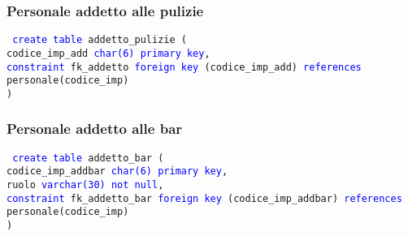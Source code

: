 \documentclass{article}
\begin{document}
    \subsubsection{Personale addetto alle pulizie}
    \begin{flushleft}
        \texttt{
        \textcolor{blue}{create table} addetto\_pulizie ( \\
        \hspace*{2em} codice\_imp\_add \hspace*{2em} \textcolor{blue}{char(6)} \hspace*{2em} \textcolor{blue}{primary key}, \\
        \hspace*{2em} \textcolor{blue}{constraint} fk\_addetto \textcolor{blue}{foreign key} (codice\_imp\_add) \textcolor{blue}{references} \hspace*{2em} personale(codice\_imp) \\)}
    \end{flushleft}

    \subsubsection{Personale addetto alle bar}
    \begin{flushleft}
        \texttt{
        \textcolor{blue}{create table} addetto\_bar ( \\
        \hspace*{2em} codice\_imp\_addbar \hspace*{2em} \textcolor{blue}{char(6)} \hspace*{3.9em} \textcolor{blue}{primary key}, \\
        \hspace*{2em} ruolo \hspace*{7.7em} \textcolor{blue}{varchar(30)} \hspace*{2em} \textcolor{blue}{not null}, \\
        \hspace*{2em} \textcolor{blue}{constraint} fk\_addetto\_bar \textcolor{blue}{foreign key} (codice\_imp\_addbar) \textcolor{blue}{references} \hspace*{2em} personale(codice\_imp) \\)}
    \end{flushleft}
\end{document}
